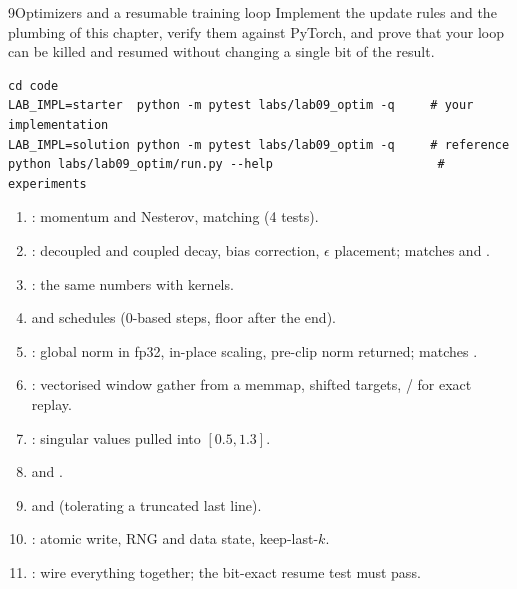 \begin{labbox}{9}{Optimizers and a resumable training loop}
Implement the update rules and the plumbing of this chapter, verify them against PyTorch, and
prove that your loop can be killed and resumed without changing a single bit of the result.

\begin{lstlisting}[style=shell]
cd code
LAB_IMPL=starter  python -m pytest labs/lab09_optim -q     # your implementation
LAB_IMPL=solution python -m pytest labs/lab09_optim -q     # reference
python labs/lab09_optim/run.py --help                       # experiments
\end{lstlisting}

\begin{enumerate}
  \item {}: momentum and Nesterov, matching  (4 tests).
  \item {}: decoupled and coupled decay, bias correction, $\epsilon$
        placement; matches  and .
  \item {}: the same numbers with  kernels.
  \item {} and  schedules (0-based steps, floor after the end).
  \item {}: global norm in fp32, in-place scaling, pre-clip norm returned;
        matches .
  \item {}: vectorised window gather from a memmap, shifted targets,
        / for exact replay.
  \item {}: singular values pulled into $[0.5,1.3]$.
  \item {} and .
  \item {} and  (tolerating a truncated last line).
  \item {}: atomic write, RNG and data state, keep-last-$k$.
  \item {}: wire everything together; the bit-exact resume test must pass.
\end{enumerate}


\end{labbox}
